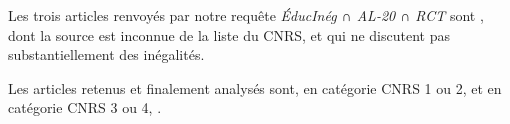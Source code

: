 \documentclass[pagesize, twoside=off, bibliography=totoc, DIV=calc, fontsize=12pt, a4paper, french]{scrartcl}
\begin{document}
Les trois articles renvoyés par notre requête \emph{ÉducInég ∩ AL-20 ∩ RCT} sont \citet{balsa_randomized_2016}, dont la source est inconnue de la liste du CNRS, et \citet{cristia_technology_2017, frisancho_impact_2020} qui ne discutent pas substantiellement des inégalités.

Les articles retenus et finalement analysés sont, en catégorie CNRS 1 ou 2, \citet{albertus_land_2020,arabsheibani_changes_2006,bravo_effects_2010,bursztyn_poverty_2016,ferreira_rise_2008,frisancho_impact_2020,levy_latin_2013,messina_twenty_2020,psacharopoulos_poverty_1995,resende_simulating_2021,staab_putting_2011} et en catégorie CNRS 3 ou 4, \citet{berthelon_school_2023,birdsall_education_1998,carlson_education_2002,cavalcanti_barriers_2010,mejia-guevara_intergenerational_2024,trejos_inequality_2004,urbina_intergenerational_2018}.


\end{document}
